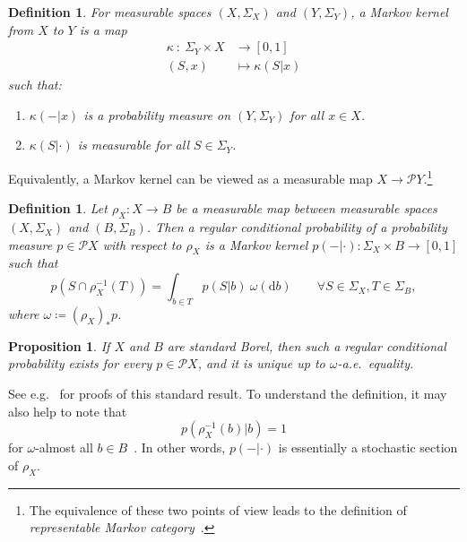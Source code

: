 \documentclass[11pt,a4paper]{scrartcl}
\newcommand{\dx}{\mathrm{d}}
\newcommand{\giry}{\mathcal{P}}
\newtheorem{defi}[theo]{Definition}
\newtheorem{prop}[theo]{Proposition}
\theoremstyle{definition}
\begin{document}
\begin{defi}
	For measurable spaces $(X, \Sigma_X)$ and $(Y, \Sigma_Y)$, a \emph{Markov kernel} from $X$ to $Y$ is a map
	\begin{align*}
		\kappa \: : \: \Sigma_Y \times X & \longrightarrow [0,1] \\
		(S, x) & \longmapsto \kappa(S|x)
	\end{align*}
	such that:
	\begin{enumerate}[label=(\roman*)]
		\item $\kappa(-|x)$ is a probability measure on $(Y, \Sigma_Y)$ for all $x \in X$.
		\item $\kappa(S|\cdot)$ is measurable for all $S \in \Sigma_Y$.
	\end{enumerate}
\end{defi}

Equivalently, a Markov kernel can be viewed as a measurable map $X \to \giry Y$.\footnote{The equivalence of these two points of view leads to the definition of \emph{representable Markov category}~\cite[Definition~3.10]{Fritz2023}.}

\begin{defi}
	Let $\rho_X : X \to B$ be a measurable map between measurable spaces $(X,\Sigma_X)$ and $(B,\Sigma_B)$.
	Then a \emph{regular conditional probability} of a probability measure $p \in \giry X$ with respect to $\rho_X$ is a Markov kernel $p(-|\cdot) : \Sigma_X \times B \to [0,1]$ such that
  \begin{equation}
		\label{eq:disintegration}
		p(S \cap \rho_X^{-1}(T)) = \int_{b \in T} p(S|b) \  \omega(\dx b)
		\qquad
		\forall S \in \Sigma_X, T \in \Sigma_B,
	\end{equation}
	where $\omega \coloneq (\rho_X)_\ast p$.
\end{defi}

\begin{prop}\label{prop:regularconditionalprobability}
	If $X$ and $B$ are standard Borel, then such a regular conditional probability exists for every $p \in \giry X$,
	and it is unique up to $\omega$-a.e.~equality.
\end{prop}

See e.g.~\cite[Lemma 10.4.3 \& Proposition 10.4.12]{Bogachev2007} for proofs of this standard result.
To understand the definition, it may also help to note that
\begin{equation}
	\label{eq:fiberconcentration}
	p(\rho_X^{-1}(b)|b) = 1
\end{equation}
for $\omega$-almost all $b \in B$~\cite[Example~10.4.11]{Bogachev2007}.
In other words, $p(-|\cdot)$ is essentially a stochastic section of $\rho_X$.
\end{document}
